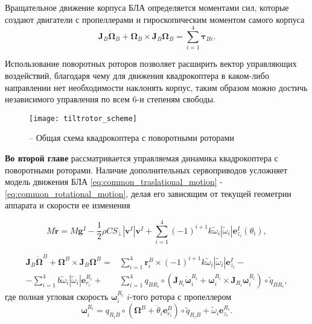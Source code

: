 Вращательное движение корпуса БЛА определяется моментами сил, которые создают двигатели с пропеллерами и гироскопическим моментом самого корпуса
\begin{equation} \label{eq:common_rotational_motion}
\bm{J}_B\dot{\bm{\Omega}}_B + \bm{\Omega}_B \times  \bm{J}_B{\bm{\Omega}_B} = \sum_{i=1}^{4}{\bm{\tau}_{Bi}}.
\end{equation}

Использование поворотных роторов позволяет расширить вектор управляющих воздействий, благодаря чему для движения квадрокоптера в каком-либо направлении нет необходимости наклонять корпус, таким образом можно достичь независимого управления по всем 6-и степеням свободы.

\begin{figure}[H]
	\centering
	\texttt{[image: tiltrotor\_scheme]}
	\caption{ -- Общая схема квадрокоптера с поворотными роторами}
	\label{fig:tiltrotor_scheme}
\end{figure}

\textbf{Во второй главе} рассматривается управляемая динамика квадрокоптера с поворотными роторами. Наличие дополнительных сервоприводов усложняет модель движения БЛА \eqref{eq:common_traslational_motion} - \eqref{eq:common_rotational_motion}, делая его зависящим от текущей геометрии аппарата и скорости ее изменения

\begin{equation} \label{eq:m_traslational_motion}
M \ddot{\bm{r}} = M \bm{g}^I - \frac{1}{2} \rho C S_{\perp} |\bm{v}^I| \bm{v}^I + \sum_{i=1}^{4}{ { (-1)^{i+1} k \tilde \omega_i |\tilde \omega_i| \bm{e}^I_{z_i}}(\theta_i)},
\end{equation}

\begin{equation} \label{eq:m_final_rotational_motion}
\begin{aligned}
\bm{J}_B\dot{\bm{\Omega}}^B + \bm{\Omega}^B \times \bm{J}_B{\bm{\Omega}^B} =
&\sum_{i=1}^{4} {\bm{r}^B_i \times
	(-1)^{i+1} k \tilde \omega_i |\tilde \omega_i| \bm{e}^I_{z_i}} - \\
-\sum_{i=1}^{4} {b \tilde \omega_i |\tilde \omega_i| \bm e^{R_i}_{r_i}} +
&\sum_{i=1}^{4} q_{ B {R_i}} \circ (\bm{J}_{R_i}\dot{\bm{\omega}}^{R_i}_i + \bm{\omega}^{R_i}_i \times \bm{J}_{R_i}{\bm{\omega}^{R_i}_i}) \circ \tilde q_{ B {R_i}}
,
\end{aligned}
\end{equation}
где полная угловая скорость $\bm{\omega}^{R_i}_i$ $i$-того ротора с пропеллером
\begin{equation} \label{eq:m_prop_ang_vel}
\bm{\omega}^{R_i}_i =
q_{{R_i} B} \circ (\bm{\Omega}^B + \dot {\theta}_i \bm e^B_{r_i}) \circ \tilde {q}_{{R_i}B} +
\tilde \omega_i \bm{e}^{R_i}_{z_i}
.
\end{equation}

